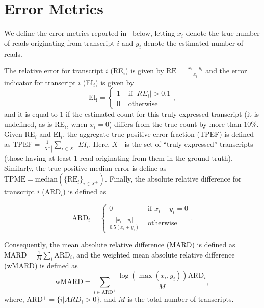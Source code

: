 \section{Error Metrics}
\label{subsec:error_def}

We define the error metrics reported in~ below, letting $x_i$ denote the true number of reads originating from transcript $i$ and $y_i$ denote the estimated number of reads.

The relative error for transcript $i$ (RE$_i$) is given by $\mathrm{RE_i} = \frac{x_i - y_i}{x_i}$ and the error indicator for transcript $i$ (EI$_i$) is given by
%
\begin{equation}
  \mathrm{EI_i} =
  \begin{cases}
    1 & \text{ if } \left|RE_i\right| > 0.1 \\
    0 & \text{ otherwise }
  \end{cases},
  \label{eqn:tpeii}
\end{equation}
%
and it is equal to $1$ if the estimated count for this truly expressed transcript (it is undefined, as is RE$_i$, when $x_i = 0$) differs from the true count by more than $10\%$.  Given RE$_i$ and EI$_i$, the aggregate true positive error fraction (TPEF) is defined as $\text{TPEF} = \frac{1}{\left|X^{+}\right|}  \sum_{i \in X^{+}} EI_i$. Here, $X^{+}$ is the set of ``truly expressed'' transcripts (those having at least $1$ read originating from them in the ground truth).  Similarly, the true positive median error is define as $\text{TPME} = \text{median}\left(\{\text{RE}_i\}_{i \in X^{+}}\right)$.
Finally, the absolute relative difference for transcript $i$ (ARD$_i$) is defined as

\begin{equation}
  \text{ARD}_i =
  \begin{cases}
    0                                            & \text{ if } x_i + y_i  = 0 \\
    \frac{\left|x_i - y_i\right|}{0.5 \left(x_i + y_i\right)} & \text{ otherwise }
  \end{cases}.
\end{equation}

Consequently, the mean absolute relative difference (MARD) is defined as $\text{MARD} = \frac{1}{M} \sum_{i} \text{ARD}_i$, and the weighted mean absolute relative difference (wMARD) is defined as
%
\begin{equation}
  \text{wMARD} = \sum_{i \in \text{ARD}^{+}}
    \frac{\log\left(\max\left(x_i, y_i\right)\right) \text{ARD}_i}{M},
\end{equation}
%
where, ARD$^{+} = \{i | ARD_i > 0\}$, and $M$ is the total number of transcripts.
